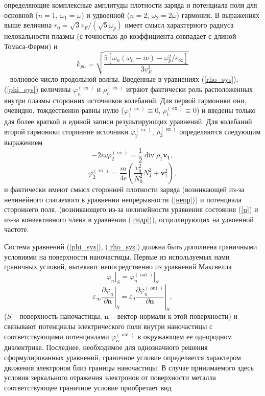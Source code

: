 \documentclass[12pt, a4paper]{article}
\renewcommand{\vec}{\mathbf}
\def \eps {\varepsilon}
\def \w {\omega}
\def \ph {\varphi}
\def \ex { \operatorname{ex}}
\def \out { \operatorname{out}}
\newcommand{\dn}[1]{\left.\frac{\partial #1}{\partial \vec{n}}\right|_{ S}}
\begin{document}
определяющие комплексные амплитуды плотности заряда и потенциала поля для основной ($n=1$, $\w_1=\w$) и удвоенной ($n=2$, $\w_2=2\w$) гармоник.
В выражениях выше величина $r_0 = \sqrt{3}v_F/(\sqrt{5}\w_p)$ имеет смысл характерного радиуса нелокальности плазмы (с точностью до коэффициента совпадает с длиной Томаса-Ферми) и  
\begin{equation} 
k_{pn} = \sqrt{\frac{5[\w_{n}(\w_{n} - i\nu) - \w_p^2/\eps_\infty]}{3v_F^2}} 
\end{equation}
-- волновое число продольной волны.
Введенные в уравнениях (\ref{rho_sys}), (\ref{phi_sys}) величины $\ph^{(\ex)}_{n}$ и $\rho^{(\ex)}_{n}$ играют фактически роль расположенных внутри плазмы сторонних источников колебаний. Для первой гармоники они, очевидно, тождественно равны нулю ($\ph^{(\ex)}_1\equiv0$, $\rho^{(\ex)}_1\equiv0$) и введены только для более краткой и единой записи результирующих уравнений. Для колебаний второй гармоники сторонние источники $\ph^{(\ex)}_2$, $\rho^{(\ex)}_2$ определяются следующим выражением 
\begin{equation}
	\label{rho_ex}
 - 2i\w \rho^{(\ex)}_2 = \frac{1}{2}\operatorname{div} \rho_1 \vec{v_1},
\end{equation}
\begin{equation}
	\label{phi_ex}
\ph^{(\ex)}_2 = \frac{m}{4e}\left(\frac{v_0^2}{N_0^2}N_1^2 + \vec{v}_1^2\right),
\end{equation}
и фактически имеют смысл сторонней плотности заряда (возникающей из-за нелинейного слагаемого в уравнении непрерывности (\ref{непр})) и потенциала стороннего поля, (возникающего из-за нелинейности уравнения состояния (\ref{p}) и из-за конвективного члена в уравнении (\ref{гидр})), осциллирующих на удвоенной частоте. 

Система уравнений (\ref{phi_sys}), (\ref{rho_sys}) должна быть дополнена граничными условиями на поверхности наночастицы. Первые из используемых нами граничных условий, вытекают непосредственно из уравнений Максвелла
\begin{equation} 
	\label{g_u1}
	\left. \ph_n \right|_{ S} = \left. \ph_n^{(\out)} \right|_{ S} 
\end{equation}
\begin{equation} 
	\label{g_u2}
	\eps_\infty \dn{\ph_n} = \eps_d \dn{\ph_n^{(\out)}},
\end{equation}
($S$ -- поверхность наночастицы, $\vec{n}$ -- вектор нормали к этой поверхности) и связывают потенциалы электрического поля внутри наночастицы с соответствующими потенциалами $\ph_{n}^{(\out)}$ в окружающем ее однородном диэлектрике.
Последнее, необходимое для однозначного решения сформулированных уравнений, граничное условие определяется характером движения электронов близ границы наночастицы. В случае принимаемого здесь условия зеркального отражения электронов от поверхности металла соответствующее граничное условие приобретает вид
\end{document}
